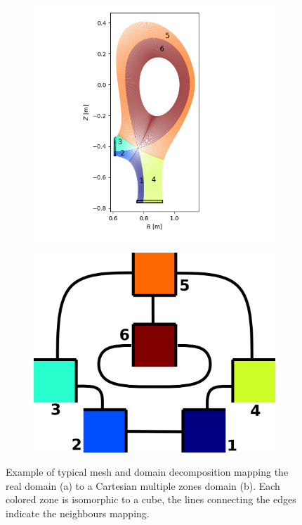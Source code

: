 \begin{figure}[H]\centering
	\begin{subfigure}[c]{0.5\textwidth}
		\centering
		\includegraphics[width=1\textwidth]{schemes/TCVmesh.png}
		\label{fig:TCVmesh}
	\end{subfigure}
	\begin{subfigure}[c]{0.3\textwidth}
		\centering
		\includegraphics[width=1\textwidth]{schemes/TCV_domains.png}
		\label{fig:TCV_domains}
	\end{subfigure}
	
	\caption{ Example of typical mesh and domain decomposition mapping the real domain (a) to a Cartesian multiple zones domain (b). Each colored zone is isomorphic to a cube, the lines connecting the edges indicate the neighbours mapping. }
	\label{fig:TCVzoneDecomposition}
\end{figure}

